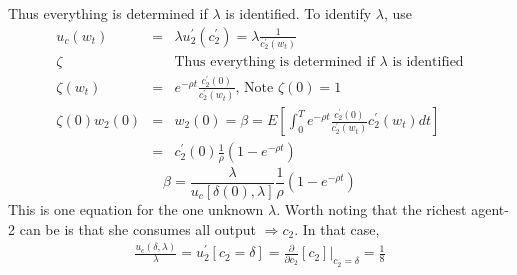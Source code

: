 \documentclass[]{article}
\begin{document}
Thus everything is determined if $\lambda $ is identified. To identify $\lambda $, use
\begin{eqnarray*}
u_c(w_t) &=& \lambda u_2^\prime(c_2^\prime) = \lambda \frac{1}{c_2^\prime (w_t)}\\
\zeta &&\mbox{Thus everything is determined if $\lambda $ is identified}\\
\zeta (w_t) &=& e^{-\rho t} \frac{c_2^\prime(0)}{c_2^\prime (w_t)} \mbox{, Note }\zeta(0) =1\\
\zeta (0) w_2(0) &=& w_2(0) = \beta = E\left[\int_0^T e^{-\rho t} \frac{c_2^\prime(0)}{c_2^\prime(w_t)} c_2^\prime(w_t)dt\right]\\
&=& c_2^\prime(0) \frac{1}{\rho} (1-e^{-\rho t})
\end{eqnarray*}
\begin{equation}
\beta = \frac{\lambda}{u_c [\delta(0),\lambda]} \frac{1}{\rho} (1-e^{-\rho t}) \tag{17}
\end{equation}
This is one equation for the one unknown $\lambda $. Worth noting that the richest agent-2 can be is that she consumes all output $\Rightarrow c_2$. In that case,
\begin{eqnarray*}
\frac{u_c(\delta , \lambda)}{\lambda} = u_2^\prime [c_2=\delta] = \frac{\partial}{\partial c_2} [c_2] |_{c_2=\delta} = \frac{1}{8}
\end{eqnarray*}
\end{document}
